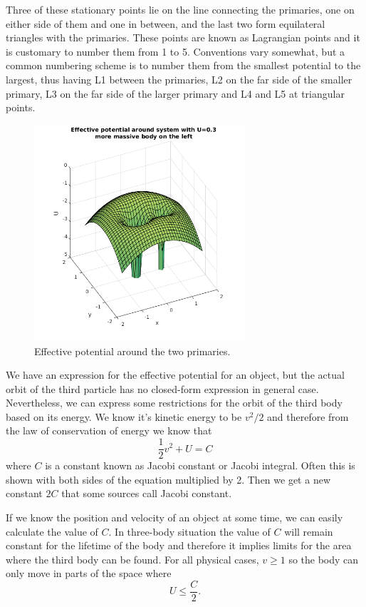 \documentclass[12pt,a4paper,titlepage]{article}
\begin{document}
Three of these stationary points lie on the line connecting the primaries, one on either side of them and one in between, and the last two form equilateral triangles with the primaries. These points are known as Lagrangian points and it is customary to number them from 1 to 5. Conventions vary somewhat, but a common numbering scheme is to number them from the smallest potential to the largest, thus having L1 between the primaries, L2 on the far side of the smaller primary, L3 on the far side of the larger primary and L4 and L5 at triangular points. \cite{dj}

\begin{figure}
\centering
\includegraphics[width=0.7\textwidth]{../plots/potential.png}
\caption{Effective potential around the two primaries.}
\label{potential}
\end{figure}

We have an expression for the effective potential for an object, but the actual orbit of the third particle has no closed-form expression in general case. Nevertheless, we can express some restrictions for the orbit of the third body based on its energy. We know it's kinetic energy to be $v^2/2$ and therefore from the law of conservation of energy we know that
\begin{equation}
	\frac{1}{2}v^2 + U = C
\end{equation}
where $C$ is a constant known as Jacobi constant or Jacobi integral. Often this is shown with both sides of the equation multiplied by 2. Then we get a new constant $2C$ that some sources call Jacobi constant. \cite{dj, tm}

If we know the position and velocity of an object at some time, we can easily calculate the value of $C$. In three-body situation the value of $C$ will remain constant for the lifetime of the body and therefore it implies limits for the area where the third body can be found. For all physical cases, $v \geq 1$ so the body can only move in parts of the space where \cite{dj, tm}
\begin{equation}
	U \leq \frac{C}{2}.
\end{equation}
\end{document}
